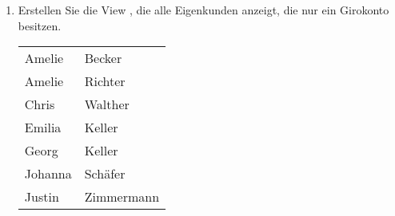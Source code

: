 \begin{enumerate}
\begin{center}
        \end{center}
        \item Erstellen Sie die View , die alle Eigenkunden anzeigt, die nur ein Girokonto besitzen.
        \begin{center}
          \begin{small}
            \tablehead{}
            \tabletail {
            }
            \begin{msoraclesql}
              \begin{supertabular}{ll}
                Amelie & Becker \\
                Amelie & Richter \\
                Chris & Walther \\
                Emilia & Keller \\
                Georg & Keller \\
                Johanna & Sch\"afer \\
                Justin & Zimmermann \\
              \end{supertabular}
            \end{msoraclesql}
          \end{small}
        \end{center}
      \end{enumerate}

